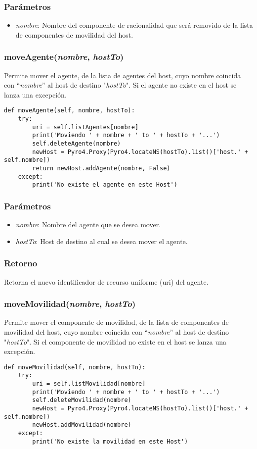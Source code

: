 \documentclass{article}
\begin{document}
\subsubsection*{Parámetros}
\begin{itemize}
\item \textit{nombre}: Nombre del componente de racionalidad que será removido de la lista de componentes de movilidad del host.
\end{itemize}
\subsubsection{\textbf{moveAgente}(\textit{nombre}, \textit{hostTo})}
Permite mover el agente, de la lista de agentes del host, cuyo nombre coincida con ``\textit{nombre}'' al host de destino "\textit{hostTo}". Si el agente no existe en el host se lanza una excepción.
\begin{lstlisting}
def moveAgente(self, nombre, hostTo):  
	try:
		uri = self.listAgentes[nombre]
		print('Moviendo ' + nombre + ' to ' + hostTo + '...')
		self.deleteAgente(nombre)
		newHost = Pyro4.Proxy(Pyro4.locateNS(hostTo).list()['host.' + self.nombre])
		return newHost.addAgente(nombre, False)
	except:
		print('No existe el agente en este Host')
\end{lstlisting}
\subsubsection*{Parámetros}
\begin{itemize}
\item \textit{nombre}: Nombre del agente que se desea mover.
\item \textit{hostTo}: Host de destino al cual se desea mover el agente.
\end{itemize}
\subsubsection*{Retorno}
Retorna el nuevo identificador de recurso uniforme (uri) del agente.
\subsubsection{\textbf{moveMovilidad}(\textit{nombre}, \textit{hostTo})}
Permite mover el componente de movilidad, de la lista de componentes de movilidad del host, cuyo nombre coincida con ``\textit{nombre}'' al host de destino "\textit{hostTo}". Si el componente de movilidad no existe en el host se lanza una excepción.
\begin{lstlisting}
def moveMovilidad(self, nombre, hostTo):  
	try:
		uri = self.listMovilidad[nombre]
		print('Moviendo ' + nombre + ' to ' + hostTo + '...')
		self.deleteMovilidad(nombre)
		newHost = Pyro4.Proxy(Pyro4.locateNS(hostTo).list()['host.' + self.nombre])
		newHost.addMovilidad(nombre)
	except:
		print('No existe la movilidad en este Host')
\end{lstlisting}
\end{document}
